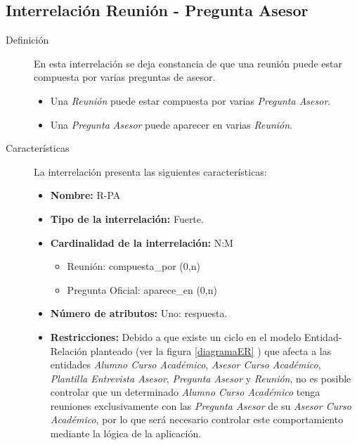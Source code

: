\subsection{Interrelación Reunión - Pregunta Asesor}

   \begin{description}
      \item[Definición] En esta interrelación se deja constancia de que una
      reunión puede estar compuesta por varias preguntas de asesor.

      \begin{itemize}
       \item Una \textit{Reunión} puede estar compuesta por varias
             \textit{Pregunta Asesor}.
       \item Una \textit{Pregunta Asesor} puede aparecer en varias
             \textit{Reunión}.
      \end{itemize}

      \item[Características] La interrelación presenta las siguientes
                             características:

         \begin{itemize}
            \item \textbf{Nombre:} R-PA
            \item \textbf{Tipo de la interrelación:} Fuerte.
            \item \textbf{Cardinalidad de la interrelación:} N:M
                  \begin{itemize}
                     \item Reunión: compuesta\_por (0,n)
                     \item Pregunta Oficial: aparece\_en (0,n)
                  \end{itemize}
            \item \textbf{Número de atributos:} Uno: respuesta.
            \item \textbf{Restricciones:} Debido a que existe un ciclo en el
                  modelo Entidad-Relación planteado (ver la figura
                  \ref{diagramaER} ) que afecta a las entidades \textit{Alumno
                  Curso Académico}, \textit{Asesor Curso Académico},
                  \textit{Plantilla Entrevista Asesor}, \textit{Pregunta Asesor}
                  y \textit{Reunión}, no es posible controlar que un determinado
                  \textit{Alumno Curso Académico} tenga reuniones exclusivamente
                  con las \textit{Pregunta Asesor} de su \textit{Asesor Curso
                  Académico}, por lo que será necesario controlar este
                  comportamiento mediante la lógica de la aplicación.
         \end{itemize}


\end{description}
